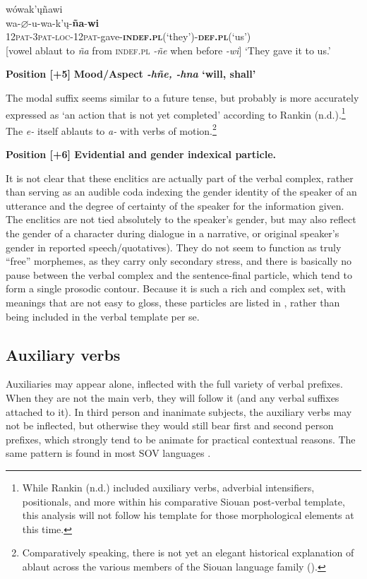 \documentclass[output=paper]{LSP/langsci}
\begin{document}
\begin{exe}
\ex \glll  w\'owak'\k{u}\~nawi  \\
wa-\textbf{$\varnothing$}-u-wa-k'\k{u}-\textbf{\~na}-\textbf{wi}    \\
\textsc{12pat-3pat-loc-12pat-}gave-\textbf{\textsc{indef.pl}}(`they')-\textbf{\textsc{def.pl}}(`us')  \\     

[vowel ablaut to \textit{\~na} from \textsc{indef.pl} \textit{-\~ne} when before \textit{-wi}]
\trans `They gave it to us.'  \citep[240]{Whitman1947}
\end{exe} 

\textbf{Position [+5]} \textbf{Mood/Aspect \textit{-h\~ne, -hna} `will, shall'}

The modal suffix seems similar to a future tense, but probably is more accurately expressed as `an action that is not yet completed' according to Rankin (n.d.).\footnote{While Rankin (n.d.) included auxiliary verbs, adverbial intensifiers, positionals, and more within his comparative Siouan post-verbal template, this analysis will not follow his template for those morphological elements at this time.}   The \textit{e-} itself ablauts to \textit{a-} with verbs of motion.\footnote{Comparatively speaking, there is not yet an elegant historical explanation of ablaut across the various members of the Siouan language family (\citealt[466-468]{Rankin2005}).}  

\vspace{1em}
\textbf{Position [+6]  Evidential and gender indexical particle.}

It is not clear that these enclitics are actually part of the verbal complex, rather than serving as an audible coda indexing the gender identity of the speaker of an utterance and the degree of certainty of the speaker for the information given. The enclitics are not tied absolutely to the speaker's gender, but may also reflect the gender of a character during dialogue in a narrative, or original speaker's gender in reported speech/quotatives).  They do not seem to function as truly ``free'' morphemes, as they carry only secondary stress, and there is basically no pause between the verbal complex and the sentence-final particle, which tend to form a single prosodic contour.  Because it is such a rich and complex set, with meanings that are not easy to gloss, these particles are listed in , rather than being included in the verbal template per se.   

\subsection{Auxiliary verbs}
Auxiliaries may appear alone, inflected with the full variety of verbal prefixes. When they are not the main verb, they will follow it (and any verbal suffixes attached to it).  In third person and inanimate subjects, the auxiliary verbs may not be inflected, but otherwise they would still bear first and second person prefixes, which strongly tend to be animate for practical contextual reasons.  The same pattern is found in most SOV languages \citep[490]{Rankin2005}.  
\end{document}
